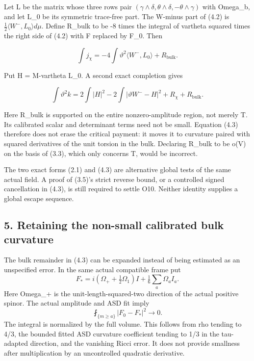 \documentclass[
  10pt,
]{article}
\begin{document}
Let L be the matrix whose three rows pair
\((\gamma\wedge\delta,\theta\wedge\delta,-\theta\wedge\gamma)\) with
Omega\_b, and let L\_0 be its symmetric trace-free part. The W-minus
part of (4.2) is \(\tfrac12\langle W^-,L_0\rangle d\mu\). Define R\_bulk
to be -8 times the integral of vartheta squared times the right side of
(4.2) with F replaced by F\_0. Then

\[
 \int j_\chi=-4\int\vartheta^2\langle W^-,L_0\rangle+R_{\mathrm{bulk}}.
\]

Put H = M-vartheta L\_0. A second exact completion gives

\[
 \boxed{\int\vartheta^2k
     =2\int|H|^2-2\int|\vartheta W^--H|^2
                                     +R_\chi+R_{\mathrm{bulk}}.} \tag{4.3}
\]

Here R\_bulk is supported on the entire nonzero-amplitude region, not
merely T. Its calibrated scalar and determinant terms need not be small.
Equation (4.3) therefore does not erase the critical payment: it moves
it to curvature paired with squared derivatives of the unit torsion in
the bulk. Declaring R\_bulk to be o(V) on the basis of (3.3), which only
concerns T, would be incorrect.

The two exact forms (2.1) and (4.3) are alternative global tests of the
same actual field. A proof of (3.5)'s strict reverse bound, or a
controlled signed cancellation in (4.3), is still required to settle
O10. Neither identity supplies a global escape sequence.

\hypertarget{retaining-the-non-small-calibrated-bulk-curvature}{%
\subsection{5. Retaining the non-small calibrated bulk
curvature}\label{retaining-the-non-small-calibrated-bulk-curvature}}

The bulk remainder in (4.3) can be expanded instead of being estimated
as an unspecified error. In the same actual compatible frame put \[
 F_*=i(\Omega_++\tfrac12\Omega_1)I
                               +\tfrac16\sum_a\Omega_a I_a.
\] Here Omega\_+ is the unit-length-squared-two direction of the actual
positive spinor. The actual amplitude and ASD fit imply \[
 \fint_{\{m\ge a\}}|F_0-F_*|^2\longrightarrow0.
\] The integral is normalized by the full volume. This follows from rho
tending to 4/3, the bounded fitted ASD curvature coefficient tending to
1/3 in the tau-adapted direction, and the vanishing Ricci error. It does
not provide smallness after multiplication by an uncontrolled quadratic
derivative.
\end{document}
